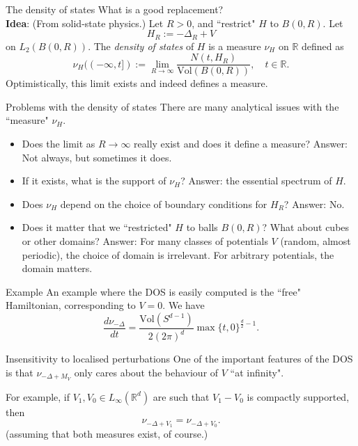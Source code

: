 \documentclass{beamer}
\numberwithin{equation}{section}
\theoremstyle{plain}
\theoremstyle{plain}
\theoremstyle{definition}
\theoremstyle{plain}
\theoremstyle{plain}
\theoremstyle{definition}
\newcommand{\Vol}{\mathrm{Vol}}
\newcommand{\Rl}{\mathbb{R}}
\begin{document}
\begin{frame}{The density of states}
    What is a good replacement?\\
    \pause
    {\bf Idea}: (From solid-state physics.) Let $R > 0$, and ``restrict" $H$ to $B(0,R).$ Let
    \[
        H_R := -\Delta_R + V
    \]
    on $L_2(B(0,R))$. The \emph{density of states} of $H$ is a measure $\nu_H$ on $\Rl$ defined as
    \[
        \nu_H((-\infty,t]) := \lim_{R\to \infty} \frac{N(t,H_R)}{\mathrm{Vol}(B(0,R))},\quad t \in \Rl.
    \] 
    Optimistically, this limit exists and indeed defines a measure. 
\end{frame}

\begin{frame}{Problems with the density of states}
    There are many analytical issues with the ``measure" $\nu_H$.
    \begin{itemize}
        \item{} Does the limit as $R\to\infty$ really exist and does it define a measure? \pause    Answer: Not always, but sometimes it does. \pause
        \item{} If it exists, what is the support of $\nu_H$? \pause   Answer: the essential spectrum of $H$. \pause
        \item{} Does $\nu_H$ depend on the choice of boundary conditions for $H_R$? \pause   Answer: No. \pause
        \item{} Does it matter that we ``restricted" $H$ to balls $B(0,R)$? What about cubes or other domains? \pause Answer: For many classes of potentials $V$ (random, almost periodic), the choice of domain is irrelevant. For arbitrary potentials, the domain matters.
    \end{itemize}
\end{frame}

\begin{frame}{Example}
    An example where the DOS is easily computed is the ``free" Hamiltonian, corresponding to $V = 0$. We have
    \begin{equation*}
        \frac{d\nu_{-\Delta}}{dt} = \frac{\Vol(S^{d-1})}{2(2\pi)^d}\max\{t,0\}^{\frac{d}{2}-1}.
    \end{equation*}
\end{frame}


\begin{frame}{Insensitivity to localised perturbations}
    One of the important features of the DOS is that $\nu_{-\Delta+M_V}$ only cares about the behaviour of $V$ ``at infinity".\pause
    
    For example, if $V_1,V_0 \in L_{\infty}(\Rl^d)$ are such that $V_1-V_0$ is compactly supported, then 
    \[
        \nu_{-\Delta+{V_1}}=\nu_{-\Delta+{V_0}}.
    \]
    (assuming that both measures exist, of course.)
\end{frame}
\end{document}
